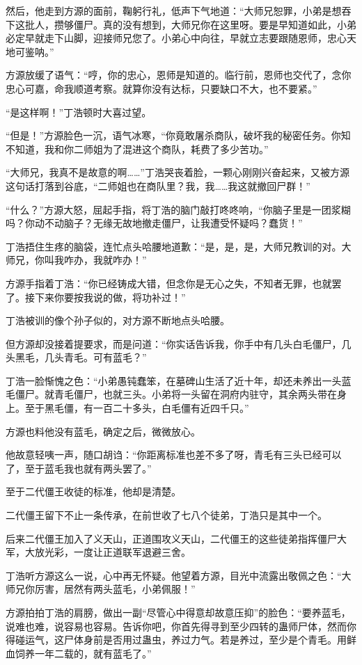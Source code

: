 \begin{this_body}
然后，他走到方源的面前，鞠躬行礼，低声下气地道：“大师兄恕罪，小弟是想吞下这批人，攒够僵尸。真的没有想到，大师兄你在这里呀。要是早知道如此，小弟必定早就走下山脚，迎接师兄您了。小弟心中向往，早就立志要跟随恩师，忠心天地可鉴呐。”

方源放缓了语气：“哼，你的忠心，恩师是知道的。临行前，恩师也交代了，念你忠心可嘉，命我顺道考察。就算你没有达标，只要缺口不大，也不要紧。”

“是这样啊！”丁浩顿时大喜过望。

“但是！”方源脸色一沉，语气冰寒，“你竟敢屠杀商队，破坏我的秘密任务。你知不知道，我和你二师姐为了混进这个商队，耗费了多少苦功。”

“大师兄，我真不是故意的啊……”丁浩哭丧着脸，一颗心刚刚兴奋起来，又被方源这句话打落到谷底，“二师姐也在商队里？我，我……我这就撤回尸群！”

“什么？”方源大怒，屈起手指，将丁浩的脑门敲打咚咚响，“你脑子里是一团浆糊吗？你动不动脑子？无缘无故地撤走僵尸，让我遭受怀疑吗？蠢货！”

丁浩捂住生疼的脑袋，连忙点头哈腰地道歉：“是，是，是，大师兄教训的对。大师兄，你叫我咋办，我就咋办！”

方源手指着丁浩：“你已经铸成大错，但念你是无心之失，不知者无罪，也就罢了。接下来你要按我说的做，将功补过！”

丁浩被训的像个孙子似的，对方源不断地点头哈腰。

但方源却没接着提要求，而是问道：“你实话告诉我，你手中有几头白毛僵尸，几头黑毛，几头青毛。可有蓝毛？”

丁浩一脸惭愧之色：“小弟愚钝蠢笨，在墓碑山生活了近十年，却还未养出一头蓝毛僵尸。就青毛僵尸，也就三头。小弟将一头留在洞府内驻守，其余两头带在身上。至于黑毛僵，有一百二十多头，白毛僵有近四千只。”

方源也料他没有蓝毛，确定之后，微微放心。

他故意轻咦一声，随口胡诌：“你距离标准也差不多了呀，青毛有三头已经可以了，至于蓝毛我也就有两头罢了。”

至于二代僵王收徒的标准，他却是清楚。

二代僵王留下不止一条传承，在前世收了七八个徒弟，丁浩只是其中一个。

后来二代僵王加入了义天山，正道围攻义天山，二代僵王的这些徒弟指挥僵尸大军，大放光彩，一度让正道联军退避三舍。

丁浩听方源这么一说，心中再无怀疑。他望着方源，目光中流露出敬佩之色：“大师兄你厉害，居然有两头蓝毛，小弟佩服！”

方源拍拍丁浩的肩膀，做出一副“尽管心中得意却故意压抑”的脸色：“要养蓝毛，说难也难，说容易也容易。告诉你吧，你首先得寻到至少四转的蛊师尸体，然而你得碰运气，这尸体身前是否用过蛊虫，养过力气。若是养过，至少是个青毛。用鲜血饲养一年二载的，就有蓝毛了。”


\end{this_body}
